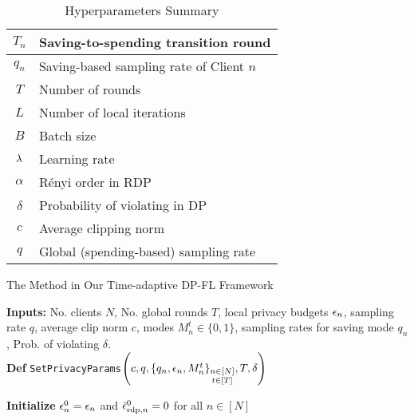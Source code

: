 \begin{minipage}{0.47\textwidth} 
\begin{table}[H]
\centering
\begin{threeparttable}
\caption{Hyperparameters Summary}
\label{sec3:notations}  \scriptsize
\begin{tabular}{|c|l|}
\hline
$T_n$ & Saving-to-spending transition round 
\\ \hline 
$q_n$ & Saving-based sampling rate of Client $n$ 
 \\ \hline \hline
$T$ & Number of rounds \\ \hline
$L$ & Number of local iterations
\\ \hline
 $B$ & Batch size \\ \hline
$\lambda$ & Learning rate 
\\ \hline
$\alpha$ & R\'{e}nyi order in RDP \\ \hline
$\delta$ & Probability of violating in DP  
\\ \hline
$c$ & Average clipping norm \\ \hline
 $q$ & Global (spending-based) sampling rate 
\\ \hline
\end{tabular}
\end{threeparttable}
\end{table}  
 \vspace{-1em}
  \raggedright  %
\begin{algorithm}[H]
  \scriptsize
\caption{The \algasgo Method in Our Time-adaptive DP-FL Framework}
\textbf{Inputs:} No. clients $N$, No. global rounds $T$, local privacy budgets ${\epsilon}_n$, sampling rate $q$, average clip norm $c$, modes $M_n^t \in\{0,1\}$, sampling rates for saving mode $q_n$, Prob. of violating $\delta$. \\ 
\label{alg:tidpfl:privacy}
\textbf{Def} \texttt{SetPrivacyParams}$\left(c, q,  \{q_n, {\epsilon}_n, M_n^t\}_{\substack{n\in [N]\\ t\in [T]}}, T, \delta\right)$
\begin{algorithmic}[1]
\State \textbf{Initialize} ${\epsilon}_n^0 = {\epsilon}_n$  and $\bar{{\epsilon}}_{\text{rdp},n}^0=0$
for all $n\in [N]$

\end{algorithmic}
\end{algorithm}
\end{minipage}
